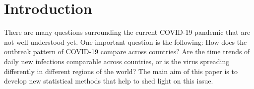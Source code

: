 \documentclass[a4paper,12pt]{article}
\numberwithin{equation}{section}
\begin{document}
\renewcommand{\baselinestretch}{1.2}\normalsize




\section{Introduction}


There are many questions surrounding the current COVID-19 pandemic that are not well understood yet. One important question is the following: How does the outbreak pattern of COVID-19 compare across countries? Are the time trends of daily new infections %
comparable across countries, or is the virus spreading differently in different regions of the world? The main aim of this paper is to develop new statistical methods that help to shed light on this issue. 
\end{document}
